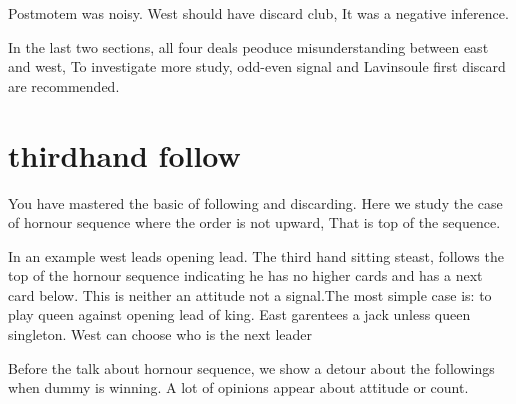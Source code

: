 Postmotem was noisy. West should have discard club, It was a 
negative inference.

In the last two sections, all four deals peoduce misunderstanding
between east and west, To investigate more study, odd-even signal and
Lavinsoule first discard are recommended.


\section{thirdhand follow}

You have mastered the basic of following and discarding. Here
we study the case of hornour sequence where the order is not
upward, That is top of the sequence.

In an example west leads opening lead. The third hand sitting steast, 
follows the top of the hornour sequence indicating he has no higher
cards and has a next card below. This is neither  an attitude not
a signal.The most simple case is: to play queen against opening lead
of king. East garentees a jack unless queen singleton.
West can choose who is the next leader

Before the talk about hornour sequence, we show a detour about
the followings when dummy is winning. A lot of opinions appear
about attitude or count.


